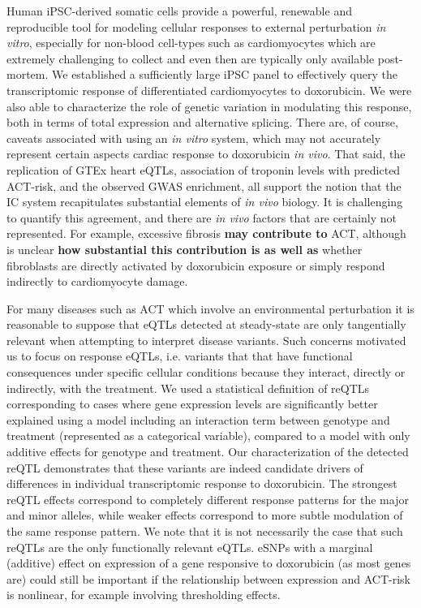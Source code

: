 \documentclass{article}
\newcommand{\tempbold}[1]{\textbf{#1}}
\begin{document}
Human iPSC-derived somatic cells provide a powerful, renewable and reproducible tool for modeling cellular responses to external perturbation \emph{in vitro}, especially for non-blood cell-types such as cardiomyocytes which are extremely challenging to collect and even then are typically only available post-mortem. 
We established a sufficiently large iPSC panel to effectively query the transcriptomic response of differentiated cardiomyocytes to doxorubicin. We were also able to characterize the role of genetic variation in modulating this response, both in terms of total expression and alternative splicing. 
There are, of course, caveats associated with using an \emph{in vitro} system, which may not accurately represent certain aspects cardiac response to doxorubicin \emph{in vivo}. 
That said, the replication of GTEx heart eQTLs, association of troponin levels with predicted ACT-risk\cite{Burridge2016}, and the observed GWAS enrichment, all support the notion that the IC system recapitulates substantial elements of \emph{in vivo} biology. 
It is challenging to quantify this agreement, and there are \emph{in vivo} factors that are certainly not represented. For example, excessive fibrosis \tempbold{may contribute to} ACT\cite{cascales2013association,zhan2016ataxia,farhad2016characterization,Heck2017-jc}, although is unclear \tempbold{how substantial this contribution is as well as} whether fibroblasts are directly activated by doxorubicin exposure or simply respond indirectly to cardiomyocyte damage. 

For many diseases such as ACT which involve an environmental perturbation it is reasonable to suppose that eQTLs detected at steady-state are only tangentially relevant when attempting to interpret disease variants.
Such concerns motivated us to focus on response eQTLs, i.e. variants that that have functional consequences under specific cellular conditions because they interact, directly or indirectly, with the treatment.
We used a statistical definition of reQTLs corresponding to cases where gene expression levels are significantly better explained using a model including an interaction term between genotype and treatment (represented as a categorical variable), compared to a model with only additive effects for genotype and treatment. 
Our characterization of the detected reQTL demonstrates that these variants are indeed candidate drivers of differences in individual transcriptomic response to doxorubicin. The strongest reQTL effects correspond to completely different response patterns for the major and minor alleles, while weaker effects correspond to more subtle modulation of the same response pattern. 
We note that it is not necessarily the case that such reQTLs are the only functionally relevant eQTLs. eSNPs with a marginal (additive) effect on expression of a gene responsive to doxorubicin (as most genes are) could still be important if the relationship between expression and ACT-risk is nonlinear, for example involving thresholding effects. 
\end{document}
